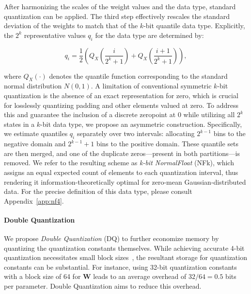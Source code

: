 After harmonizing the scales of the weight values and the data type, standard quantization can be applied. The third step effectively rescales the standard deviation of the weights to match that of the $k$-bit quantile data type. Explicitly, the $2^k$ representative values $q_i$ for the data type are determined by:

\begin{equation}
q_i  = \frac{1}{2}\left( Q_X\left(\frac{i}{2^k+1}\right) + Q_X\left(\frac{i+1}{2^k+1}\right)\right),
\end{equation}

where $Q_X(\cdot)$ denotes the quantile function corresponding to the standard normal distribution $N(0,1)$. A limitation of conventional symmetric $k$-bit quantization is the absence of an exact representation for zero, which is crucial for losslessly quantizing padding and other elements valued at zero. To address this and guarantee the inclusion of a discrete zeropoint at $0$ while utilizing all $2^k$ states in a $k$-bit data type, we propose an asymmetric construction. Specifically, we estimate quantiles $q_i$ separately over two intervals: allocating $2^{k-1}$ bins to the negative domain and $2^{k-1}+1$ bins to the positive domain. These quantile sets are then merged, and one of the duplicate zeros—present in both partitions—is removed. We refer to the resulting scheme as \emph{k-bit NormalFloat} (NFk), which assigns an equal expected count of elements to each quantization interval, thus rendering it information-theoretically optimal for zero-mean Gaussian-distributed data. For the precise definition of this data type, please consult Appendix~\ref{app:nf4}.

\paragraph{Double Quantization{}} 
We propose \emph{Double Quantization} (DQ) to further economize memory by quantizing the quantization constants themselves. While achieving accurate 4-bit quantization necessitates small block sizes~\citep{dettmers2022case}, the resultant storage for quantization constants can be substantial. For instance, using 32-bit quantization constants with a block size of 64 for $\mathbf{W}$ leads to an average overhead of $32/64 = 0.5$ bits per parameter. Double Quantization aims to reduce this overhead.

